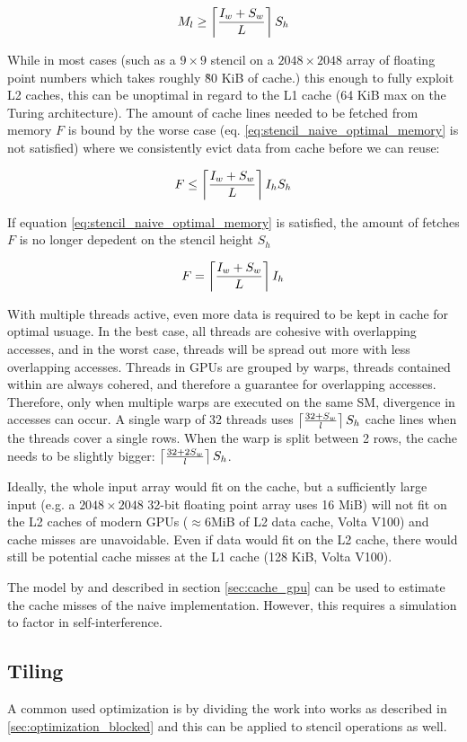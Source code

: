 \begin{equation}
    M_l \geq \left\lceil \frac{I_w + S_w}{L} \right\rceil S_h \label{eq:stencil_naive_optimal_memory}
\end{equation}

While in most cases (such as a $9\times9$ stencil on a $2048\times2048$ array of floating point numbers which takes roughly \~80 KiB of cache.) this enough to fully exploit L2 caches, this can be unoptimal in regard to the L1 cache (64 KiB max on the Turing architecture).
The amount of cache lines needed to be fetched from memory $F$ is bound by the worse case (eq. \ref{eq:stencil_naive_optimal_memory} is not satisfied) where we consistently evict data from cache before we can reuse:

\[
    F \leq \left\lceil \frac{I_w + S_w}{L} \right\rceil I_h S_h
\]

If equation \ref{eq:stencil_naive_optimal_memory} is satisfied, the amount of fetches $F$ is no longer depedent on the stencil height $S_h$

\[
    F = \left\lceil \frac{I_w + S_w}{L} \right\rceil I_h
\]

With multiple threads active, even more data is required to be kept in cache for optimal usuage.
In the best case, all threads are cohesive with overlapping accesses, and in the worst case, threads will be spread out more with less overlapping accesses.
Threads in GPUs are grouped by warps, threads contained within are always cohered, and therefore a guarantee for overlapping accesses.
Therefore, only when multiple warps are executed on the same SM, divergence in accesses can occur.
A single warp of 32 threads uses $\left\lceil \frac{32 + S_w}{l} \right\rceil S_h$ cache lines when the threads cover a single rows. 
When the warp is split between 2 rows, the cache needs to be slightly bigger: $\left\lceil \frac{32 + 2 S_w}{l} \right\rceil S_h$.

Ideally, the whole input array would fit on the cache, but a sufficiently large input (e.g. a $2048\times2048$ 32-bit floating point array uses 16 MiB) will not fit on the L2 caches of modern GPUs ($\approx6$MiB of L2 data cache, Volta V100) and cache misses are unavoidable.
Even if data would fit on the L2 cache, there would still be potential cache misses at the L1 cache (128 KiB, Volta V100).

The model by \citet{lam1991cache} and described in section \ref{sec:cache_gpu} can be used to estimate the cache misses of the naive implementation.
However, this requires a simulation to factor in self-interference.

\subsection{Tiling}
\label{sec:stencil_tiled}
A common used optimization is by dividing the work into works as described in \ref{sec:optimization_blocked} and this can be applied to stencil operations as well.


